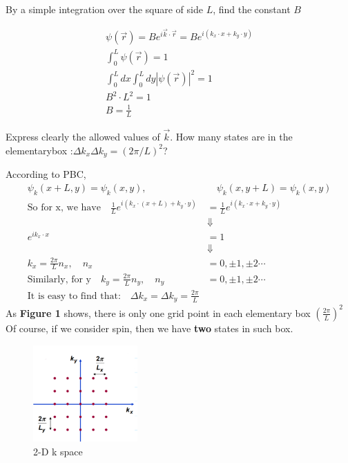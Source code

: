 \documentclass[answers]{exam}
\begin{document}
\begin{questions}
\question By a simple integration over the square of side $L$, find the constant $B$
\begin{solution}
\begin{align*}
\psi(\vec{r})=B e^{i \vec{k} \cdot \vec{r}}=B e^{i\left(k_{x} \cdot x+k_{y} \cdot y\right)}\\
\int_{0}^{L}\psi(\vec{r}) = 1 \\
\int_{0}^{L}dx\int_{0}^{L}dy|\psi(\vec{r})|^{2} = 1 \\
B^{2} \cdot L^{2} = 1 \\
B = \frac{1}{L}    
\end{align*}
\end{solution}
\newpage
\question Express clearly the allowed values of $\vec{k}$. How many states are in the elementarybox :$\Delta k_{x} \Delta k_{y}=(2 \pi / L)^{2}$?
\begin{solution}
According to PBC,
\begin{align*}
\psi_{k}(x + L, y) = \psi_{k} (x, y),&\quad \psi_{k}(x , y+L) = \psi_{k} (x, y)\\
\text{So for x, we have}\quad\frac{1}{L} e^{i\left(k_{x}\cdot(x+L)+k_{y} \cdot y\right)}&=\frac{1}{L} e^{i\left( k_{x} \cdot x+k_{y} \cdot y\right)} \\
&\Downarrow \\
e^{i k_{x}\cdot  x}&=1 \\
&\Downarrow \\
k_{x}=\frac{2 \pi}{L} n_{x}, \quad n_{x}&=0,\pm 1, \pm 2 \cdots\\
\text{Similarly, for y}\quad k_{y}=\frac{2 \pi}{L} n_{y}, \quad n_{y}&=0,\pm 1, \pm 2 \cdots\\
\text{It is easy to find that:}\quad\Delta k_{x}=\Delta k_{y}=\frac{2 \pi}{L}
\end{align*}
As \textbf{Figure 1} shows, there is only one grid point in each elementary box $\left(\frac{2\pi}{L}\right)^{2}$\\
Of course, if we consider spin, then we have \textbf{two} states in such box.
\end{solution}
\begin{figure}[h]
\centering 
    \includegraphics[width=4cm]{Figure/1.png}
    \caption{2-D k space}  
\end{figure}  


\end{questions}
\end{document}
